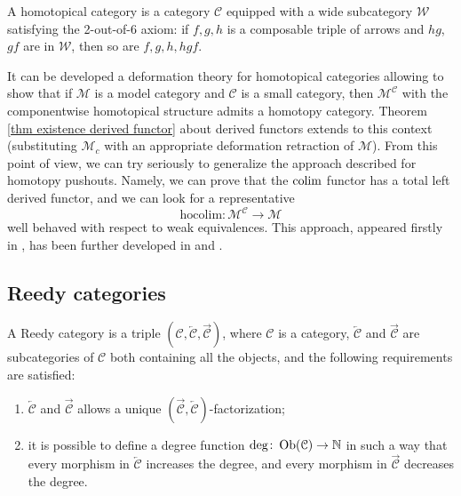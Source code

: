 \begin{refsection}
\begin{defin}
A homotopical category is a category $\mathcal C$ equipped with a wide subcategory $\mathcal W$ satisfying the 2-out-of-6 axiom: if $f,g,h$ is a composable triple of arrows and $hg$, $gf$ are in $\mathcal W$, then so are $f,g,h,hgf$.
\end{defin}

It can be developed a deformation theory for homotopical categories allowing to show that if $\mathcal M$ is a model category and $\mathcal C$ is a small category, then $\mathcal M^{\mathcal C}$ with the componentwise homotopical structure admits a homotopy category. Theorem \ref{thm existence derived functor} about derived functors extends to this context (substituting $\mathcal M_c$ with an appropriate deformation retraction of $\mathcal M$). From this point of view, we can try seriously to generalize the approach described for homotopy pushouts. Namely, we can prove that the $\operatorname*{colim}$ functor has a total left derived functor, and we can look for a representative
\[
\mathrm{hocolim} \colon \mathcal M^{\mathcal C} \to \mathcal M
\]
well behaved with respect to weak equivalences. This approach, appeared firstly in \cite{dhk}, has been further developed in \cite{shulman} and \cite{riehl}.

\subsection{Reedy categories}

\begin{defin}
A Reedy category is a triple $\left(\mathcal C, \overleftarrow{\mathcal C}, \overrightarrow{\mathcal C}\right)$, where $\mathcal C$ is a category, $\overleftarrow{\mathcal C}$ and $\overrightarrow{\mathcal C}$ are subcategories of $\mathcal C$ both containing all the objects, and the following requirements are satisfied:
\begin{enumerate}
\item $\overleftarrow{\mathcal C}$ and $\overrightarrow{\mathcal C}$ allows a unique $\left(\overrightarrow{\mathcal C}, \overleftarrow{\mathcal C}\right)$-factorization;
\item it is possible to define a degree function $\deg \colon \operatorname{Ob}(\mathcal C) \to \mathbb{N}$ in such a way that every morphism in $\overleftarrow{\mathcal C}$ increases the degree, and every morphism in $\overrightarrow{\mathcal C}$ decreases the degree.
\end{enumerate}
\end{defin}


\end{refsection}
